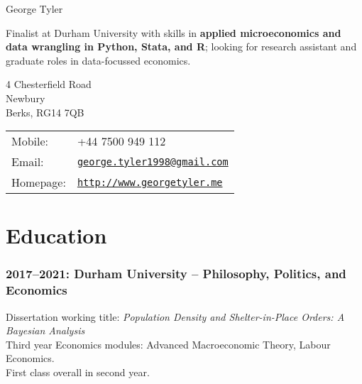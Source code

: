 \documentclass[a4]{article}
\def\name{George Tyler}
\renewenvironment{itemize}{
  \begin{list}{}{
    \setlength{\leftmargin}{1.5em}
  }
}{
  \end{list}
}
\begin{document}
{\huge \name}


\vspace{0.25in}

Finalist at Durham University with skills in \textbf{applied microeconomics and data wrangling in Python, Stata, and R}; looking for research assistant and graduate roles in data-focussed economics.

\vspace{0.25in}

\begin{minipage}{0.45\linewidth}
  4 Chesterfield Road \\
  Newbury \\
  Berks, RG14 7QB
\end{minipage}
\begin{minipage}{0.45\linewidth}
  \begin{tabular}{ll}
    Mobile: & +44 7500 949 112 \\
    Email: & \href{mailto:george.tyler1998@gmail.com}{\tt george.tyler1998@gmail.com} \\
    Homepage: & \href{http://www.georgetyler.me}{\tt http://www.georgetyler.me} \\
  \end{tabular}
\end{minipage}





\section*{Education}

\subsubsection*{2017--2021: Durham University -- Philosophy, Politics, and Economics}
Dissertation working title: \textit{Population Density and Shelter-in-Place Orders: A Bayesian Analysis} \\
Third year Economics modules: Advanced Macroeconomic Theory, Labour Economics. \\
First class overall in second year.%
\end{document}
